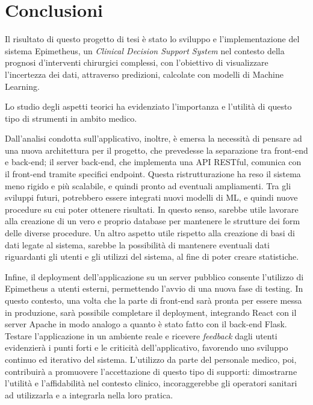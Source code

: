 \chapter*{Conclusioni}
\label{ch:conclusioni}

Il risultato di questo progetto di tesi è stato lo sviluppo e l’implementazione del sistema Epimetheus, un \textit{Clinical Decision Support System} nel contesto della prognosi d'interventi chirurgici complessi, con l'obiettivo di visualizzare l'incertezza dei dati, attraverso predizioni, calcolate con modelli di Machine Learning.

Lo studio degli aspetti teorici ha evidenziato l’importanza e l’utilità di questo tipo di strumenti in ambito medico.

Dall'analisi condotta sull'applicativo, inoltre, è emersa la necessità di pensare ad una nuova architettura per il progetto, che prevedesse la separazione tra front-end e back-end; il server back-end, che implementa una API RESTful, comunica con il front-end tramite specifici endpoint. Questa ristrutturazione ha reso il sistema meno rigido e più scalabile, e quindi pronto ad eventuali ampliamenti.
\newline
Tra gli sviluppi futuri, potrebbero essere integrati nuovi modelli di ML, e quindi nuove procedure su cui poter ottenere risultati. In questo senso, sarebbe utile lavorare alla creazione di un vero e proprio database per mantenere le strutture dei form delle diverse procedure.
\newline
Un altro aspetto utile rispetto alla creazione di basi di dati legate al sistema, sarebbe la possibilità di mantenere eventuali dati riguardanti gli utenti e gli utilizzi del sistema, al fine di poter creare statistiche.

Infine, il deployment dell'applicazione su un server pubblico consente l’utilizzo di Epimetheus a utenti esterni, permettendo l’avvio di una nuova fase di testing. 
\newline
In questo contesto, una volta che la parte di front-end sarà pronta per essere messa in produzione, sarà possibile completare il deployment, integrando React con il server Apache in modo analogo a quanto è stato fatto con il back-end Flask.
\newline
Testare l’applicazione in un ambiente reale e ricevere \textit{feedback} dagli utenti evidenzierà i punti forti e le criticità dell'applicativo, favorendo uno sviluppo continuo ed iterativo del sistema.
\newline
L’utilizzo da parte del personale medico, poi, contribuirà a promuovere l'accettazione di questo tipo di supporti:  dimostrarne l’utilità e l’affidabilità nel contesto clinico, incoraggerebbe gli operatori sanitari ad utilizzarla e a integrarla nella loro pratica.
